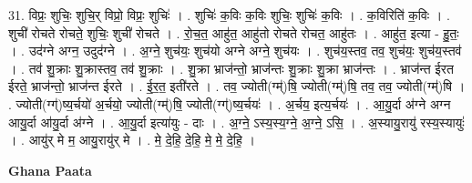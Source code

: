 \documentclass[17pt]{extarticle}
\begin{document}
31. विप्रः॒ शुचिः॒ शुचि॒र् विप्रो॒ विप्रः॒ शुचिः॑ । . शुचिः॑ क॒विः क॒विः शुचिः॒ शुचिः॑ क॒विः । . क॒विरिति॑ क॒विः । . शुची॑ रोचते रोचते॒ शुचिः॒ शुची॑ रोचते । . रो॒च॒त॒ आहु॑त॒ आहु॑तो रोचते रोचत॒ आहु॑तः । . आहु॑त॒ इत्या - हु॒तः॒ । . उद॑ग्ने अग्न॒ उदुद॑ग्ने । . अ॒ग्ने॒ शुच॑यः॒ शुच॑यो अग्ने अग्ने॒ शुच॑यः । . शुच॑य॒स्तव॒ तव॒ शुच॑यः॒ शुच॑य॒स्तव॑ । . तव॑ शु॒क्राः शु॒क्रास्तव॒ तव॑ शु॒क्राः । . शु॒क्रा भ्राज॑न्तो॒ भ्राज॑न्तः शु॒क्राः शु॒क्रा भ्राज॑न्तः । . भ्राज॑न्त ईरत ईरते॒ भ्राज॑न्तो॒ भ्राज॑न्त ईरते । . ई॒र॒त॒ इती॑रते । . तव॒ ज्योती(ग्म्॑)षि॒ ज्योती(ग्म्॑)षि॒ तव॒ तव॒ ज्योती(ग्म्॑)षि । . ज्योती(ग्ग्॑)ष्य॒र्चयो॑ अ॒र्चयो॒ ज्योती(ग्म्॑)षि॒ ज्योती(ग्ग्॑)ष्य॒र्चयः॑ । . अ॒र्चय॒ इत्य॒र्चयः॑ । . आ॒यु॒र्दा अ॑ग्ने अग्न आयु॒र्दा आ॑यु॒र्दा अ॑ग्ने । . आ॒यु॒र्दा इत्या॑युः - दाः । . अ॒ग्ने॒ ऽस्य॒स्य॒ग्ने॒ अ॒ग्ने॒ ऽसि॒ । . अ॒स्यायु॒रायु॑ रस्य॒स्यायुः॑ । . आयु॑र् मे म॒ आयु॒रायु॑र् मे । . मे॒ दे॒हि॒ दे॒हि॒ मे॒ मे॒ दे॒हि॒ । \newline

\textbf{Ghana Paata } \newline
\end{document}

